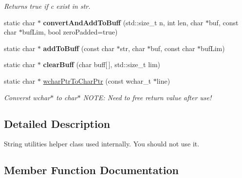 \begin{DoxyCompactItemize}
\begin{DoxyCompactList}\small\item\em Returns true if c exist in str. \end{DoxyCompactList}\item 
static char $\ast$ {\bfseries convert\+And\+Add\+To\+Buff} (std\+::size\+\_\+t n, int len, char $\ast$buf, const char $\ast$buf\+Lim, bool zero\+Padded=true)\hypertarget{classel_1_1base_1_1utils_1_1Str_a5e12c163bf1085441ea5453fd6c62fa0}{}\label{classel_1_1base_1_1utils_1_1Str_a5e12c163bf1085441ea5453fd6c62fa0}

\item 
static char $\ast$ {\bfseries add\+To\+Buff} (const char $\ast$str, char $\ast$buf, const char $\ast$buf\+Lim)\hypertarget{classel_1_1base_1_1utils_1_1Str_aa6a96f625f71661c02ecd5366533abaa}{}\label{classel_1_1base_1_1utils_1_1Str_aa6a96f625f71661c02ecd5366533abaa}

\item 
static char $\ast$ {\bfseries clear\+Buff} (char buff\mbox{[}$\,$\mbox{]}, std\+::size\+\_\+t lim)\hypertarget{classel_1_1base_1_1utils_1_1Str_adf0c36c9b8276ede18111a866e31db8b}{}\label{classel_1_1base_1_1utils_1_1Str_adf0c36c9b8276ede18111a866e31db8b}

\item 
static char $\ast$ \hyperlink{classel_1_1base_1_1utils_1_1Str_a6dc022e7e8d4cbf2c80ba9e1354feaea}{wchar\+Ptr\+To\+Char\+Ptr} (const wchar\+\_\+t $\ast$line)\hypertarget{classel_1_1base_1_1utils_1_1Str_a6dc022e7e8d4cbf2c80ba9e1354feaea}{}\label{classel_1_1base_1_1utils_1_1Str_a6dc022e7e8d4cbf2c80ba9e1354feaea}

\begin{DoxyCompactList}\small\item\em Converst wchar$\ast$ to char$\ast$ N\+O\+TE\+: Need to free return value after use! \end{DoxyCompactList}\end{DoxyCompactItemize}


\subsection{Detailed Description}
String utilities helper class used internally. You should not use it. 

\subsection{Member Function Documentation}
